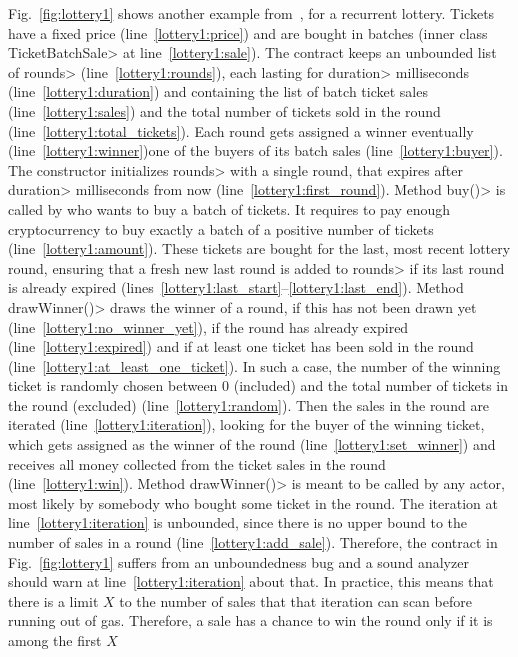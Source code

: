 Fig.~\ref{fig:lottery1} shows another example from~\cite{IyerD18}, for a recurrent lottery.
Tickets have a fixed price (line~\ref{lottery1:price}) and are bought in batches
(inner class \<TicketBatchSale> at line~\ref{lottery1:sale}). The contract
keeps an unbounded list of \<rounds> (line~\ref{lottery1:rounds}), each lasting
for \<duration> milliseconds (line~\ref{lottery1:duration}) and containing
the list of batch ticket sales (line~\ref{lottery1:sales})
and the total number of tickets sold in the round (line~\ref{lottery1:total_tickets}).
Each round gets assigned a winner eventually (line~\ref{lottery1:winner})\ie one
of the buyers of its batch sales (line~\ref{lottery1:buyer}). The constructor
initializes \<rounds> with a single round, that expires after
\<duration> milliseconds from now (line~\ref{lottery1:first_round}).
Method \<buy()> is called by who wants to buy a batch of tickets. It requires
to pay enough cryptocurrency to buy exactly a batch of a
positive number of tickets (line~\ref{lottery1:amount}).
These tickets are bought for the last, most recent lottery round,
ensuring that a fresh new last round is added to \<rounds> if its last
round is already expired (lines~\ref{lottery1:last_start}--\ref{lottery1:last_end}).
Method \<drawWinner()> draws the winner of a round, if this has not been drawn yet
(line~\ref{lottery1:no_winner_yet}), if the round has already expired
(line~\ref{lottery1:expired}) and if at least one ticket has been sold in the round
(line~\ref{lottery1:at_least_one_ticket}). In such a case, the number of
the winning ticket is randomly chosen between 0 (included) and the total number of
tickets in the round (excluded) (line~\ref{lottery1:random}).
Then the sales in the round are iterated (line~\ref{lottery1:iteration}), looking for the
buyer of the winning ticket, which gets assigned as the winner of the round
(line~\ref{lottery1:set_winner}) and receives all money collected from the ticket sales
in the round (line~\ref{lottery1:win}).
Method \<drawWinner()> is meant to be called by any actor, most likely by somebody
who bought some ticket in the round.
The iteration at line~\ref{lottery1:iteration} is unbounded, since there is
no upper bound to the number of sales in a round (line~\ref{lottery1:add_sale}).
Therefore, the contract in Fig.~\ref{fig:lottery1}
suffers from an unboundedness bug and a sound analyzer should warn
at line~\ref{lottery1:iteration} about that.
In practice, this means that there is a limit $X$
to the number of sales that that iteration can scan before running out of gas.
Therefore, a sale has a chance to win the round only if it is among the first $X$
